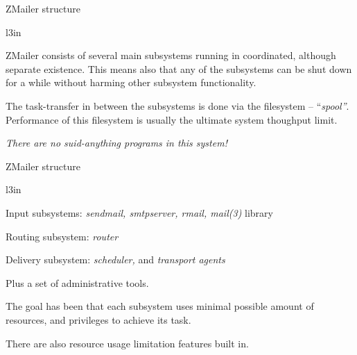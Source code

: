 \documentclass[a4paper,landscape]{slides}
\newcommand{\ZM}{ZMailer}
\begin{document}


\begin{slide}

\centerline{\large \ZM{} structure}

\begin{wrapfigure}[11]{l}{3in}
\end{wrapfigure}

\ZM{} consists of several main subsystems running in coordinated,
although separate existence.  This means also that any of the subsystems
can be shut down for a while without harming other subsystem functionality.

The task-transfer in between the subsystems is done via
the filesystem -- {``\it spool''}.
Performance of this filesystem is usually the ultimate system thoughput limit.

\vfill
\centerline{\it There are no suid-anything programs in this system!}

\vfill

\end{slide}



\begin{slide}

\centerline{\large \ZM{} structure}

\begin{wrapfigure}[6]{l}{3in}
\end{wrapfigure}

Input subsystems: {\it sendmail, smtpserver, rmail, mail(3)} library

Routing subsystem: {\it router}

Delivery subsystem: {\it scheduler,} and {\it transport agents}

Plus a set of administrative tools.

The goal has been that each subsystem uses minimal possible amount of
resources, and privileges to achieve its task.

There are also resource usage limitation
features built in.
\vfill

\end{slide}

\end{document}
